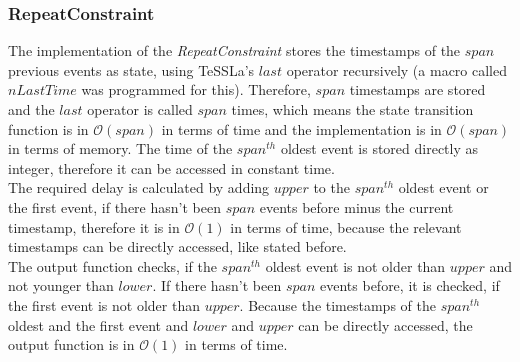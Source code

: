 \subsubsection{RepeatConstraint}
	The implementation of the \emph{RepeatConstraint} stores the timestamps of the $span$ previous events as state, using TeSSLa's $last$ operator recursively (a macro called $nLastTime$ was programmed for this). Therefore, $span$ timestamps are stored and the $last$ operator is called $span$ times, which means the state transition function is in $\mathcal{O}(span)$ in terms of time and the implementation is in $\mathcal{O}(span)$ in terms of memory. The time of the $span^{th}$ oldest event is stored directly as integer, therefore it can be accessed in constant time.\\
	The required delay is calculated by adding $upper$ to the  $span^{th}$ oldest event or the first event, if there hasn't been $span$ events before minus the current timestamp, therefore it is in $\mathcal{O}(1)$ in terms of time, because the relevant timestamps can be directly accessed, like stated before.\\
	The output function checks, if the $span^{th}$ oldest event is not older than $upper$ and not younger than $lower$. If there hasn't been $span$ events before, it is checked, if the first event is not older than $upper$. Because the timestamps of the $span^{th}$ oldest and the first event and $lower$ and $upper$ can be directly accessed, the output function is in $\mathcal{O}(1)$ in terms of time.
	
